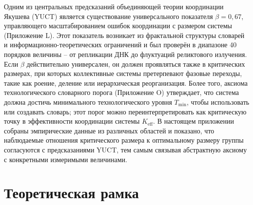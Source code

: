 \documentclass[12pt]{article}
\theoremstyle{remark}
\newcommand{\Keff}{K_{\mathrm{eff}}}
\newcommand{\Tmin}{T_{\min}}
\begin{document}
	Одним из центральных предсказаний объединяющей теории координации Якушева (YUCT) является существование универсального показателя $\beta = 0,67$, управляющего масштабированием ошибок координации с размером системы (Приложение L). Этот показатель возникает из фрактальной структуры словарей и информационно-теоретических ограничений и был проверён в диапазоне 40 порядков величины – от репликации ДНК до флуктуаций реликтового излучения. Если $\beta$ действительно универсален, он должен проявляться также в критических размерах, при которых коллективные системы претерпевают фазовые переходы, такие как роение, деление или иерархическая реорганизация. Более того, аксиома технологического словарного порога (Приложение O) утверждает, что система должна достичь минимального технологического уровня $\Tmin$, чтобы использовать или создавать словарь; этот порог можно переинтерпретировать как критическую точку в эффективности координации системы $\Keff$. В настоящем приложении собраны эмпирические данные из различных областей и показано, что наблюдаемые отношения критического размера к оптимальному размеру группы согласуются с предсказаниями YUCT, тем самым связывая абстрактную аксиому с конкретными измеримыми величинами.
	
	\section{Теоретическая рамка}
	\label{sec:theory}
	
\end{document}
